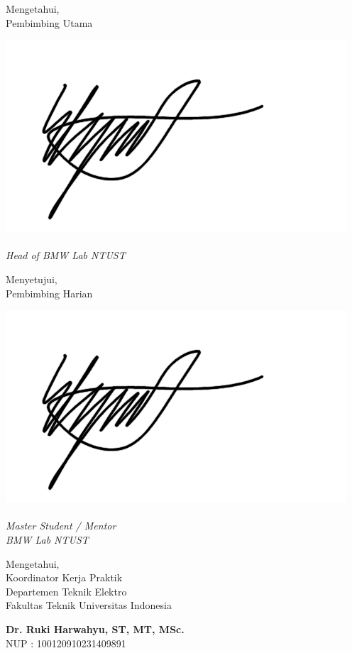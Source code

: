 \noindent %
\begin{minipage}[t]{0.5\textwidth}
    \centering
    Mengetahui, \\
    Pembimbing Utama
    
    \vspace{0.25cm}\includegraphics[width=0.5\linewidth]{assets/TandaTangan.png}\\[0.25cm]

    
    \textbf{\pembimbingUtamaTanpaProf} \\
    \textit{Head of BMW Lab NTUST}
\end{minipage}%
\begin{minipage}[t]{0.5\textwidth}
    \centering
    Menyetujui, \\
    Pembimbing Harian
    
    \vspace{0.25cm}\includegraphics[width=0.5\linewidth]{assets/TandaTangan.png}\\[0.25cm]
    
    \textbf{\pembimbingHarian} \\
    \textit{Master Student / Mentor} \\
    \textit{BMW Lab NTUST}
\end{minipage}

\vspace{1cm} %

\begin{center}
    Mengetahui, \\
    Koordinator Kerja Praktik \\
    Departemen Teknik Elektro \\
    Fakultas Teknik Universitas Indonesia
    
    \vspace{2cm} 
    
    \textbf{Dr. Ruki Harwahyu, ST, MT, MSc.} \\
    NUP : 100120910231409891
\end{center}

\vfill 
